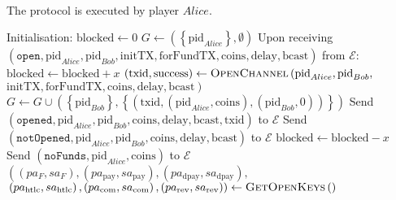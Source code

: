 \ \\  The protocol is executed by player $Alice$.
  \label{alg:lightningprot}
  \begin{algorithmic}[1]
    \State Initialisation:
    \Indent
      \State $\mathrm{blocked} \leftarrow 0$
      \State $G \leftarrow \left(\left\{\mathrm{pid}_{Alice}\right\}, \emptyset\right)$
    \EndIndent
    \State
    \State Upon receiving $\left(\mathtt{open}, \mathrm{pid}_{Alice}, \mathrm{pid}_{Bob},
    \mathrm{initTX}, \mathrm{forFundTX}, \mathrm{coins}, \mathrm{delay},
    \mathrm{bcast}\right)$
    \Indent
      \Indent
        \State from $\mathcal{E}$:
      \EndIndent
    \EndIndent
    \Indent
        \State $\mathrm{blocked} \leftarrow \mathrm{blocked} + x$
        \State $\left(\mathrm{txid}, \mathrm{success}\right) \gets
        \textsc{OpenChannel}\left(\mathrm{pid}_{Alice}, \mathrm{pid}_{Bob},\right.$
        \Indent
          \Indent
            \State $\left.\mathrm{initTX}, \mathrm{forFundTX}, \mathrm{coins},
            \mathrm{delay}, \mathrm{bcast}\right)$
          \EndIndent
        \EndIndent
          \State $G \leftarrow G \cup \left(\left\{\mathrm{pid}_{Bob}\right\},
          \left\{\left(\mathrm{txid}, \left(\mathrm{pid}_{Alice}, \mathrm{coins}\right),
          \left(\mathrm{pid}_{Bob}, 0\right)\right)\right\}\right)$
          \State Send $\left(\mathtt{opened}, \mathrm{pid}_{Alice}, \mathrm{pid}_{Bob},
          \mathrm{coins}, \mathrm{delay}, \mathrm{bcast}, \mathrm{txid}\right)$ to
          $\mathcal{E}$
        \Else
          \State Send $\left(\mathtt{notOpened}, \mathrm{pid}_{Alice}, \mathrm{pid}_{Bob},
          \mathrm{coins}, \mathrm{delay}, \mathrm{bcast}\right)$ to $\mathcal{E}$
        \EndIf
        \State $\mathrm{blocked} \leftarrow \mathrm{blocked} - x$
      \Else
        \State Send $\left(\mathtt{noFunds}, \mathrm{pid}_{Alice}, \mathrm{coins}\right)$
        to $\mathcal{E}$
      \EndIf
    \EndIndent
    \State
      \State $\left(\left(pa_F, sa_F\right), \left(pa_{\mathrm{pay}},
      sa_{\mathrm{pay}}\right), \left(pa_{\mathrm{dpay}},
      sa_{\mathrm{dpay}}\right),\right.$
      \Indent
        \State $\left.\left(pa_{\mathrm{htlc}}, sa_{\mathrm{htlc}}\right),
        \left(pa_{\mathrm{com}}, sa_{\mathrm{com}}\right), \left(pa_{\mathrm{rev}},
        sa_{\mathrm{rev}}\right)\right) \gets \textsc{GetOpenKeys}\left(\right)$

\end{algorithmic}
